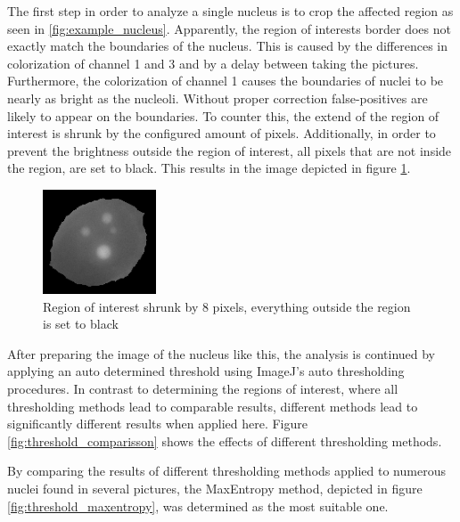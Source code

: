 \documentclass[a4paper, 12pt, twoside]{article}
\begin{document}
The first step in order to analyze a single nucleus is to crop the affected
region as seen in \ref{fig:example_nucleus}. Apparently, the region of interests
border does not exactly match the boundaries of the nucleus. This is caused by
the differences in colorization of channel 1 and 3 and by a delay between taking
the pictures. Furthermore, the colorization of channel 1 causes the boundaries
of nuclei to be nearly as bright as the nucleoli. Without proper correction
false-positives are likely to appear on the boundaries. To counter this, the
extend of the region of interest is shrunk by the configured amount of pixels.
Additionally, in order to prevent the brightness outside the region of interest,
all pixels that are not inside the region, are set to black. This results in the
image depicted in figure \ref{fig:example_nucleus_shrinked_blacked}.

\begin{figure}
\vspace{-14pt}
\includegraphics[width=0.3\textwidth]{images/example_nucleus_shrinked8_blacked}
\caption{Region of interest shrunk by 8 pixels, everything outside the region
is set to black}
\label{fig:example_nucleus_shrinked_blacked}
\end{figure}

After preparing the image of the nucleus like this, the analysis is continued by
applying an auto determined threshold using ImageJ's auto thresholding
procedures. In contrast to determining the regions of interest, where all
thresholding methods lead to comparable results, different methods lead to
significantly different results when applied here. Figure
\ref{fig:threshold_comparisson} shows the effects of different thresholding
methods.

By comparing the results of different thresholding methods applied to numerous
nuclei found in several pictures, the MaxEntropy method, depicted in figure
\ref{fig:threshold_maxentropy}, was determined as the most suitable one.
\end{document}
